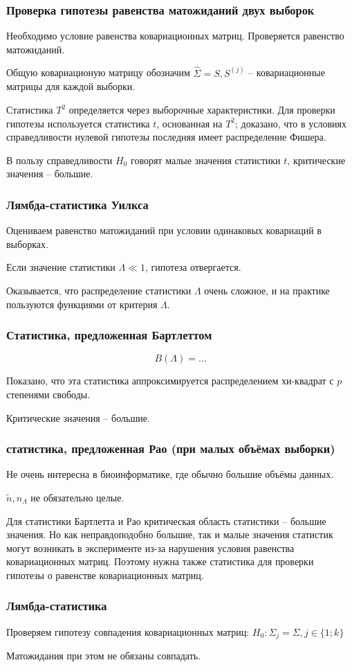 \documentclass[main.tex]{subfiles}
\begin{document}
\subsubsection{Проверка гипотезы равенства матожиданий двух выборок}

Необходимо условие равенства ковариационных матриц.
Проверяется равенство матожиданий.

Общую ковариационую матрицу обозначим $ \hat \Sigma = S, S^{(j)} $ -- ковариационные матрицы для каждой выборки.

Статистика $ T^2 $ определяется через выборочные характеристики.
Для проверки гипотезы используется статистика $t$, основанная на $ T^2 $; доказано, что в условиях справедливости нулевой гипотезы последняя имеет распределение Фишера.

В пользу справедливости $H_0$ говорят малые значения статистики $ t $, критические значения -- большие.

\subsubsection{Лямбда-статистика Уилкса}

Оцениваем равенство матожиданий при условии одинаковых ковариаций в выборках.

Если значение статистики  $ \Lambda \ll 1 $, гипотеза отвергается.

Оказывается, что распределение статистики $ \Lambda $ очень сложное, и на практике пользуются функциями от критерия $ \Lambda $.

\subsubsection{Статистика, предложенная Бартлеттом}

$$ B(\Lambda) = ... $$ %

Показано, что эта статистика аппроксимируется распределением хи-квадрат с $ p $ степенями свободы.

Критические значения -- большие.

\subsubsection{статистика, предложенная Рао (при малых объёмах выборки)}

Не очень интересна в биоинформатике, где обычно большие объёмы данных.

$ \tilde n, n_\Lambda $ не обязательно целые.

Для статистики Бартлетта и Рао критическая область статистики -- большие значения.
Но как неправдоподобно большие, так и малые значения статистик могут возникать в эксперименте из-за нарушения условия равенства ковариационных матриц.
Поэтому нужна также статистика для проверки гипотезы о равенстве ковариационных матриц.

\subsubsection{Лямбда-статистика}

Проверяем гипотезу совпадения ковариационных матриц: $ H_0: \Sigma_j = \Sigma, j \in \{1;k\} $

Матожидания при этом не обязаны совпадать.
\end{document}
